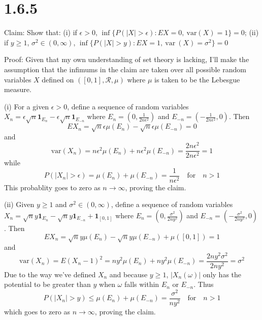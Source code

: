 \documentclass[10pt]{article}
\begin{document}
\section*{1.6.5}

Claim: Show that: (i) if $\epsilon > 0$,
$\inf\{P (\vert X \vert > \epsilon) : EX = 0,\ 
\text{var} (X) = 1 \} = 0$;
(ii) if $y \ge 1$, $\sigma^2 \in (0, \infty)$,
$\inf\{P(\vert X \vert > y) : EX = 1,\ 
\text{var} \ (X) = \sigma^2 \} = 0$

Proof: Given that my own understanding of set theory
is lacking, I'll make the assumption that the infimums
in the claim are taken over all possible random
variables $X$ defined on $([0,1], \mathcal{R}, \mu)$
where $\mu$ is taken to be the Lebesgue measure.

(i) For a given $\epsilon > 0$, 
define a sequence of random variables
$X_n = \epsilon \sqrt{n} \mathbf{1}_{E_n} 
- \epsilon \sqrt{n} \mathbf{1}_{E_{-n}}$
where $E_n = (0,\frac{1}{2n\epsilon^2})$ 
and $E_{-n} = (-\frac{1}{2n\epsilon^2}, 0)$.
Then
\begin{equation*}
  EX_n = \sqrt{n} \epsilon \mu(E_n) 
  - \sqrt{n} \epsilon \mu(E_{-n}) = 0
\end{equation*}
and
\begin{equation*}
  \text{var} (X_n) = n \epsilon^2 \mu(E_n) 
  + n \epsilon^2 \mu(E_{-n}) 
  = \frac{2n\epsilon^2}{2n\epsilon^2}
  = 1
\end{equation*}
while
\begin{equation*}
  P(\vert X_n \vert > \epsilon) = \mu(E_n) + \mu(E_{-n})
  = \frac{1}{n\epsilon^2} 
  \quad  \text{for} \quad n > 1
\end{equation*}
This probablity goes to zero as $n \to \infty$,
proving the claim.

(ii) Given $y \ge 1$ and $\sigma^2 \in (0, \infty)$, 
define a sequence of random variables
$X_n = \sqrt{n} y \mathbf{1}_{E_n}
- \sqrt{n} y \mathbf{1}_{E_{-n}} + \mathbf{1}_{[0,1]}$
where $E_n = (0,\frac{\sigma^2}{2ny^2})$ 
and $E_{-n} = (-\frac{\sigma^2}{2ny^2}, 0)$.
Then
\begin{equation*}
  EX_n = \sqrt{n} y \mu(E_n) 
  - \sqrt{n} y \mu(E_{-n}) 
  + \mu([0,1]) = 1
\end{equation*}
and
\begin{equation*}
  \text{var} (X_n) = E(X_n - 1)^2
  = n y^2 \mu(E_n) 
  + n y^2 \mu(E_{-n})
  = \frac{2ny^2\sigma^2}{2ny^2}
  = \sigma^2
\end{equation*}
Due to the way we've defined $X_n$ and because $y \ge 1$, 
$\vert X_n(\omega) \vert$ only has the potential to be 
greater than $y$ when $\omega$ falls within $E_n$ or $E_{-n}$. 
Thus
\begin{equation*}
  P(\vert X_n \vert > y) \le \mu(E_n) + \mu(E_{-n})
  = \frac{\sigma^2}{ny^2} 
  \quad  \text{for} \quad n > 1
\end{equation*}
which goes to zero as $n \to \infty$, proving the claim.
\end{document}
